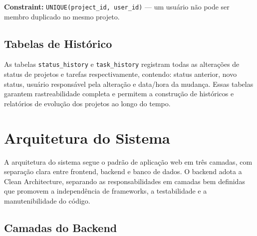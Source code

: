 \documentclass[a4paper,12pt,oneside]{article}
\begin{document}
\textbf{Constraint:} \texttt{UNIQUE(project\_id, user\_id)} --- um usuário não pode ser membro duplicado no mesmo projeto.

\subsection{Tabelas de Histórico}

As tabelas \texttt{status\_history} e \texttt{task\_history} registram todas as alterações de status de projetos e tarefas respectivamente, contendo: status anterior, novo status, usuário responsável pela alteração e data/hora da mudança. Essas tabelas garantem rastreabilidade completa e permitem a construção de históricos e relatórios de evolução dos projetos ao longo do tempo.

\section{Arquitetura do Sistema}

A arquitetura do sistema segue o padrão de aplicação web em três camadas, com separação clara entre frontend, backend e banco de dados. O backend adota a Clean Architecture, separando as responsabilidades em camadas bem definidas que promovem a independência de frameworks, a testabilidade e a manutenibilidade do código.

\subsection{Camadas do Backend}
\end{document}
